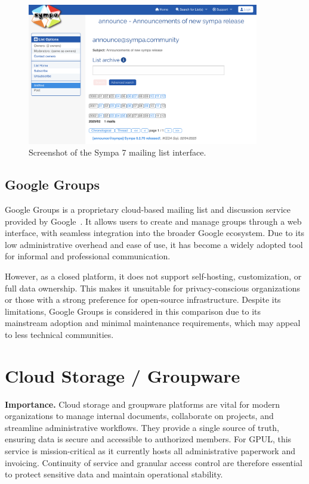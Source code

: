 \begin{figure}[h!]
  \centering
  \includegraphics[width=0.9\textwidth]{imaxes/sympa.png}
  \caption{Screenshot of the Sympa 7 mailing list interface.}
  \label{fig:sympa}
\end{figure}

\subsection*{Google Groups}

Google Groups is a proprietary cloud-based mailing list and discussion service provided by Google~\cite{google-groups-docs}. It allows users to create and manage groups through a web interface, with seamless integration into the broader Google ecosystem. Due to its low administrative overhead and ease of use, it has become a widely adopted tool for informal and professional communication.

However, as a closed platform, it does not support self-hosting, customization, or full data ownership. This makes it unsuitable for privacy-conscious organizations or those with a strong preference for open-source infrastructure. Despite its limitations, Google Groups is considered in this comparison due to its mainstream adoption and minimal maintenance requirements, which may appeal to less technical communities.

\section{Cloud Storage / Groupware}

\textbf{Importance.} Cloud storage and groupware platforms are vital for modern organizations to manage internal documents, collaborate on projects, and streamline administrative workflows. They provide a single source of truth, ensuring data is secure and accessible to authorized members. For GPUL, this service is mission-critical as it currently hosts all administrative paperwork and invoicing. Continuity of service and granular access control are therefore essential to protect sensitive data and maintain operational stability.


